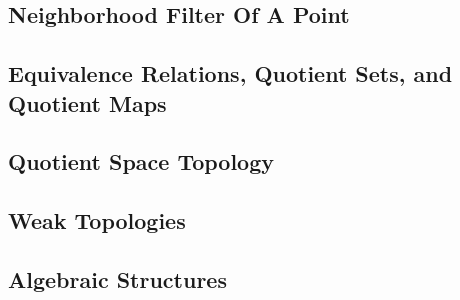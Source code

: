 \subsection{Neighborhood Filter Of A Point}



\subsection{Equivalence Relations, Quotient Sets, and Quotient Maps}

 

 



\subsection{Quotient Space Topology}


\subsection{Weak Topologies}


\subsection{Algebraic Structures}


















